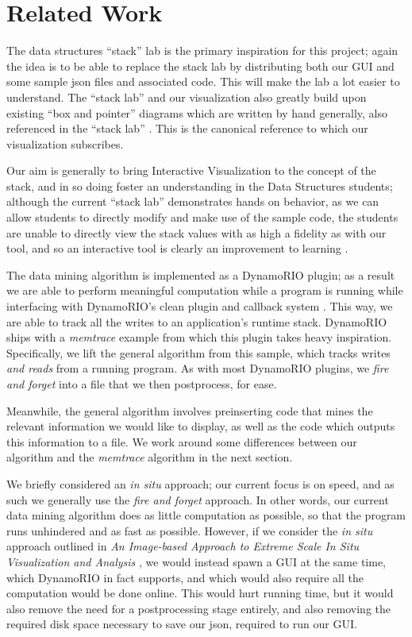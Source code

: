 \documentclass[12pt]{article}
\begin{document}
\section{Related Work}
The data structures “stack” lab \cite{Barb} is the primary inspiration for this project; again the
idea is to be able to replace the stack lab by distributing both our GUI and some sample
json files and associated code. This will make the lab a lot easier to understand.
The “stack lab” and our visualization also greatly build upon existing “box and pointer”
diagrams which are written by hand generally, also referenced in the “stack lab” \cite{Barb}.
This is the canonical reference to which our visualization subscribes.

Our aim is generally to bring Interactive Visualization to the concept of the stack, and in so
doing foster an understanding in the Data Structures students; although the current “stack
lab” demonstrates hands on behavior, as we can allow students to directly modify and make
use of the sample code, the students are unable to directly view the stack values with as high
a fidelity as with our tool, and so an interactive tool is clearly an improvement to learning
\cite{VizCS}.

The data mining algorithm is implemented as a DynamoRIO plugin; as a result we are able
to perform  meaningful computation while a program is running while interfacing with
DynamoRIO’s clean plugin and callback system \cite{DynamoRIO}. This way, we are able to track all
the writes to an application’s runtime stack. DynamoRIO ships with a \textit{memtrace}
example from which this plugin takes heavy inspiration. Specifically, we lift the general
algorithm from this sample, which tracks writes \textit{and reads} from a running program.
As with most DynamoRIO plugins, we \textit{fire and forget} into a file that we then
postprocess, for ease.

Meanwhile, the general algorithm involves preinserting code that mines the relevant
information we would like to display, as well as the code which outputs this information
to a file. We work around some differences between our algorithm and the \textit{memtrace}
algorithm in the next section.

We briefly considered an \textit{in situ} approach; our current focus is on speed, and as
such we generally use the \textit{fire and forget} approach. In other words, our current
data mining algorithm does as little computation as possible, so that the program runs
unhindered and as fast as possible. However, if we consider the \textit{in situ} approach outlined
in \textit{An Image-based Approach to Extreme Scale In Situ Visualization and Analysis}
\cite{InSitu}, we would instead spawn a GUI at the same
time, which DynamoRIO in fact supports, and which would also require all the computation
would be done online. This would hurt running time, but it would also remove the need for a
postprocessing stage entirely, and also removing the required disk space necessary to save
our json, required to run  our GUI.
\end{document}

